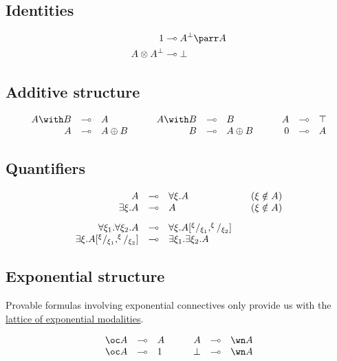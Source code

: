 \subsection{Identities}\label{identities}
\begin{align*}
\one &\limp A\orth\parr A \\
A\tens A\orth &\limp\bot
\end{align*}

\subsection{Additive structure}\label{additive-structure}

\begin{equation*}
\begin{array}{rclcrclcrcl}
  A\with B & \limp&  A & \quad&  A\with B & \limp&  B & \quad&  A & \limp&  \top\\
  A & \limp&  A\plus B & \quad&  B & \limp&  A\plus B & \quad&  \zero & \limp&  A
\end{array}
\end{equation*}

\subsection{Quantifiers}\label{quantifiers-2}

\begin{equation*}
\begin{array}{rcll}
  A & \multimap&  \forall \xi.A  & \quad  (\xi\notin A) \\
  \exists \xi.A & \multimap&  A  & \quad  (\xi\notin A) \\[2ex]
  \forall \xi_1.\forall \xi_2. A & \multimap&  \forall \xi. A[^\xi/_{\xi_1},^\xi/_{\xi_2}] \\
  \exists \xi.A[^\xi/_{\xi_1},^\xi/_{\xi_2}] & \multimap&  \exists \xi_1. \exists \xi_2.A
\end{array}
\end{equation*}

\subsection{Exponential structure}\label{exponential-structure}

Provable formulas involving exponential connectives only provide us with
the \hyperref[lattice-of-exponential-modalities]{lattice of exponential modalities}.

\begin{equation*}
\begin{array}{rclcrcl}
  \oc A & \limp&  A & \quad&  A& \limp& \wn A\\
  \oc A & \limp&  1 & \quad&  \bot & \limp&  \wn A
\end{array}
\end{equation*}

